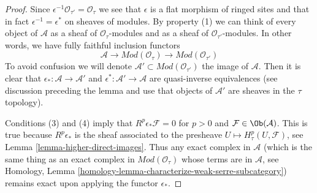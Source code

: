 \begin{proof}
Since $\epsilon^{-1}\mathcal{O}_{\tau'} = \mathcal{O}_\tau$
we see that $\epsilon$ is a flat morphism of ringed sites
and that in fact $\epsilon^{-1} = \epsilon^*$ on sheaves
of modules. By property (1) we can think of every object of
$\mathcal{A}$ as a sheaf of $\mathcal{O}_\tau$-modules
and as a sheaf of $\mathcal{O}_{\tau'}$-modules.
In other words, we have fully faithful inclusion functors
$$
\mathcal{A} \to \textit{Mod}(\mathcal{O}_\tau) \to
\textit{Mod}(\mathcal{O}_{\tau'})
$$
To avoid confusion we will denote
$\mathcal{A}' \subset \textit{Mod}(\mathcal{O}_{\tau'})$
the image of $\mathcal{A}$. Then it is clear that
$\epsilon_* : \mathcal{A} \to \mathcal{A}'$ and
$\epsilon^* : \mathcal{A}' \to \mathcal{A}$ are
quasi-inverse equivalences (see discussion preceding
the lemma and use that objects of $\mathcal{A}'$ are
sheaves in the $\tau$ topology).

\medskip\noindent
Conditions (3) and (4) imply that $R^p\epsilon_*\mathcal{F} = 0$
for $p > 0$ and $\mathcal{F} \in \Ob(\mathcal{A})$.
This is true because $R^p\epsilon_*$ is the sheaf associated
to the presheave $U \mapsto H^p_\tau(U, \mathcal{F})$, see
Lemma \ref{lemma-higher-direct-images}.
Thus any exact complex in $\mathcal{A}$ (which is the same thing
as an exact complex in $\textit{Mod}(\mathcal{O}_\tau)$
whose terms are in $\mathcal{A}$, see
Homology, Lemma \ref{homology-lemma-characterize-weak-serre-subcategory})
remains exact upon applying the functor $\epsilon_*$.


\end{proof}
